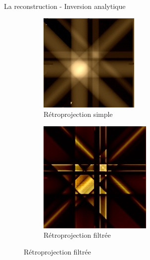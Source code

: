 \documentclass{beamer}
\begin{document}
\begin{frame}{La reconstruction - Inversion analytique}
    \begin{figure}[t]
        \centering
        \begin{subfigure}[b]{0.42\textwidth}
            \includegraphics[width=\textwidth]{retrop_simple copie.jpeg}
            \caption{Rétroprojection simple}
        \end{subfigure}
        \qquad \qquad 
        \pause
        \begin{subfigure}[b]{0.42\textwidth}
            \includegraphics[width=\textwidth]{retrop_filtree copie.jpeg}
            \caption{Rétroprojection filtrée}
        \end{subfigure}
    \end{figure}
\end{frame}
\end{document}

